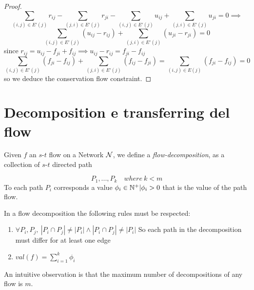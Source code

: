 \begin{proof}
    \[\sum_{(i,j)\in E'(j)}r_{ij} - \sum_{(j,i)\in E'(j)}r_{ji} -\sum_{(i,j)\in E'(j)}u_{ij} + \sum_{(j,i)\in E'(j)}u_{ji}= 0 \implies\]
    \[\sum_{(i,j)\in E'(j)}(u_{ij}-r_{ij}) + \sum_{(j,i)\in E'(j)}(u_{ji}-r_{ji}) = 0 \]
    since $r_{ij} = u_{ij} - f_{ji} + f_{ij} \implies u_{ij} -r_{ij} = f_{ji}- f_{ij}$ 
    \[\sum_{(i,j)\in E'(j)}(f_{ji}-f_{ij}) + \sum_{(j,i)\in E'(j)}(f_{ij}-f_{ji}) = \sum_{(i,j)\in E(j)}(f_{ji}-f_{ij}) = 0\]
    so we deduce the conservation flow constraint. 
    \QED
\end{proof}
\section{Decomposition e transferring del flow}

\begin{definition}
    Given $f$ an $s$-$t$ flow on a Network $\mathcal{N}$, we define a \textit{flow-decomposition}, as a collection of $s$-$t$ directed path 

    \[P_1, ..., P_k\quad where\ k < m\]
    To each path $P_i $ corresponds a value $\phi_i \in \mathbb{N^+} | \phi_i > 0$ that is the value of the path flow.

    In a flow decomposition the following rules must be respected: 
    \begin{enumerate}
        
        \item $\forall P_i, P_j,\  |P_i\cap P_j|\not = |P_i|\land |P_i\cap P_j|\not = |P_i|$ So each path in the decomposition must differ for at least one edge
        \item $ val(f) = \sum_{i = 1}^k \phi_i$
    \end{enumerate}


\end{definition}
An intuitive observation is that the maximum number of decompositions of any flow is $m$.\\
